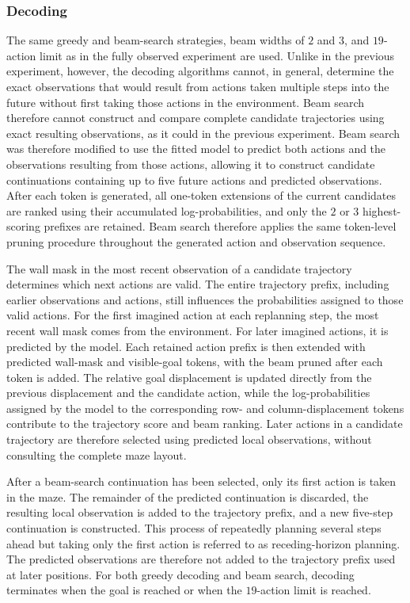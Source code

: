 ﻿\documentclass[12pt,a4paper]{article}
\theoremstyle{definition}
\begin{document}
\subsubsection{Decoding}

\label{sec:partial_decoding}

The same greedy and beam-search strategies, beam widths of $2$ and $3$, and $19$-action
limit as in the fully observed experiment are used. Unlike in the previous experiment,
however, the decoding algorithms cannot, in general, determine the exact observations that
would result from actions taken multiple steps into the future without first taking those
actions in the environment. Beam search therefore cannot construct and compare complete
candidate trajectories using exact resulting observations, as it could in the previous
experiment. Beam search was therefore modified to use the fitted model to
predict both actions and the observations resulting from those actions, allowing it to construct
candidate continuations containing up to five future actions and predicted observations.
After each token is generated, all one-token extensions of the current candidates are
ranked using their accumulated log-probabilities, and only the $2$ or $3$ highest-scoring
prefixes are retained. Beam search therefore applies the same token-level pruning procedure
throughout the generated action and observation sequence.

The wall mask in the most recent observation of a candidate trajectory determines which next 
actions are valid. The entire trajectory prefix, including earlier observations and actions, 
still influences the probabilities assigned to those valid actions. For the first imagined 
action at each replanning step, the most recent wall mask comes from the environment. 
For later imagined actions, it is predicted by the model.
Each retained action prefix is then extended with predicted wall-mask and visible-goal
tokens, with the beam pruned after each token is added. The relative goal displacement is
updated directly from the previous displacement and the candidate action, while the
log-probabilities assigned by the model to the corresponding row- and column-displacement
tokens contribute to the trajectory score and beam ranking. Later actions
in a candidate trajectory are therefore selected using predicted local observations,
without consulting the complete maze layout.

After a beam-search continuation has been selected, only its first action is taken in the
maze. The remainder of the predicted continuation is discarded, the resulting local
observation is added to the trajectory prefix, and a new five-step continuation is
constructed. This process of repeatedly planning several steps ahead but taking only the
first action is referred to as receding-horizon planning. The predicted observations are
therefore not added to the trajectory prefix used at later positions. For both
greedy decoding and beam search, decoding terminates when the goal is reached or when the
$19$-action limit is reached.
\end{document}
